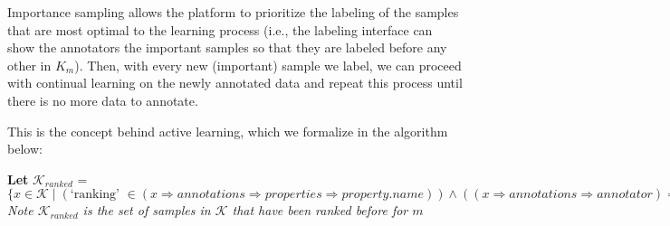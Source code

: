 \documentclass[../main.tex]{subfiles}
\begin{document}
    \clearpage

    
    Importance sampling allows the platform to prioritize the labeling of the samples that are most optimal to the learning process (i.e., the labeling interface can show the annotators the important samples so that they are labeled before any other in $K_m$). Then, with every new (important) sample we label, we can proceed with continual learning on the newly annotated data and repeat this process until there is no more data to annotate.

    This is the concept behind active learning, which we formalize in the algorithm below:

    \begin{algorithm}[H]
        \SetAlgoLined
        \textbf{Let} 
        $\mathcal{K}_{ranked}$ = $\{x \in \mathcal{K} \mid (\text{`ranking' } \in (x \Rightarrow annotations \Rightarrow properties \Rightarrow property.name)) \land ((x \Rightarrow annotations \Rightarrow annotator) = m)  \}$ \\
        \emph{Note $\mathcal{K}_{ranked}$ is the set of samples in $\mathcal{K}$ that have been ranked before for $m$} \\
\end{algorithm}
\end{document}
